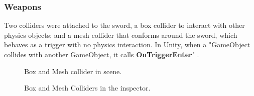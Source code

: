 \documentclass[11pt]{report}
\begin{document}
\subsubsection{Weapons}
Two colliders were attached to the sword, a box collider to interact with other physics objects; and a mesh collider that conforms around the sword, which behaves as a trigger with no physics interaction. In Unity, when a "GameObject collides with another GameObject, it calls \textbf{OnTriggerEnter}" \cite{UnityTriggerCollider}.  
\begin{figure}[H]
    \begin{minipage}{.3\textwidth}
        \centering
        \caption{Box and Mesh collider in scene.}
    \end{minipage}
    \begin{minipage}{.8\textwidth}
        \centering
        \caption{Box and Mesh Colliders in the inspector.}
    \end{minipage}
\end{figure}
\end{document}
